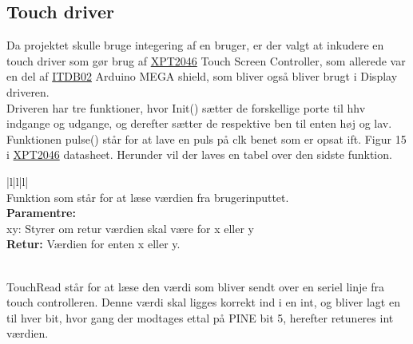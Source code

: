\subsection{Touch driver}
Da projektet skulle bruge integering af en bruger, er der valgt at inkudere en touch driver som gør brug af \href{https://blackboard.au.dk/bbcswebdav/pid-1762166-dt-content-rid-4251461_1/courses/BB-Cou-UUVA-73302/BB-Cou-UUVA-65758_ImportedContent_20170106021228/BB-Cou-STADS-UUVA-52360_ImportedContent_20160107025559/LAB/LAB10%20Touch%20Screen%20Driver/Files%20for%20LAB10/XPT2046.pdf}{XPT2046}
Touch Screen Controller, som allerede var en del af \href{https://blackboard.au.dk/bbcswebdav/pid-1762173-dt-content-rid-4251448_1/courses/BB-Cou-UUVA-73302/BB-Cou-UUVA-65758_ImportedContent_20170106021228/BB-Cou-STADS-UUVA-52360_ImportedContent_20160107025559/LAB/LAB10%20Touch%20Screen%20Driver/Files%20for%20LAB10/DS_IM120417024_ITDB02ArduinoMEGAShield.pdf}{ITDB02}
Arduino MEGA shield, som bliver også bliver brugt i Display driveren. \\
Driveren har tre funktioner, hvor Init() sætter de forskellige porte til hhv indgange og udgange, og derefter sætter de respektive ben til enten høj og lav. Funktionen pulse() står for at lave en puls på clk benet som er opsat ift. Figur 15 i \href{https://blackboard.au.dk/bbcswebdav/pid-1762166-dt-content-rid-4251461_1/courses/BB-Cou-UUVA-73302/BB-Cou-UUVA-65758_ImportedContent_20170106021228/BB-Cou-STADS-UUVA-52360_ImportedContent_20160107025559/LAB/LAB10%20Touch%20Screen%20Driver/Files%20for%20LAB10/XPT2046.pdf}{XPT2046}
datasheet. 
Herunder vil der laves en tabel over den sidste funktion. 

\begin{center}
\begin{tabular}{ |l|l|l| }
\hline
{} \\
\hline
Funktion som står for at læse værdien fra brugerinputtet.\\
\hline
\textbf{Paramentre:}  \\ xy: Styrer om retur værdien skal være for x eller y \\
\textbf{Retur:} Værdien for enten x eller y. \\
\\

\hline
\end{tabular}
\end{center}  

TouchRead står for at læse den værdi som bliver sendt over en seriel linje fra touch controlleren. Denne værdi skal ligges korrekt ind i en int, og bliver lagt en til hver bit, hvor gang der modtages ettal på PINE bit 5, herefter retuneres int værdien. 


